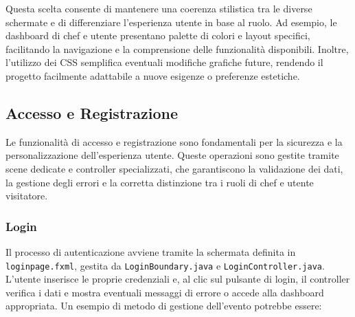 Questa scelta consente di mantenere una coerenza stilistica tra le diverse schermate e di differenziare l’esperienza utente in base al ruolo. Ad esempio, le dashboard di chef e utente presentano palette di colori e layout specifici, facilitando la navigazione e la comprensione delle funzionalità disponibili. Inoltre, l’utilizzo dei CSS semplifica eventuali modifiche grafiche future, rendendo il progetto facilmente adattabile a nuove esigenze o preferenze estetiche.

\subsection{Accesso e Registrazione}
Le funzionalità di accesso e registrazione sono fondamentali per la sicurezza e la personalizzazione dell’esperienza utente. Queste operazioni sono gestite tramite scene dedicate e controller specializzati, che garantiscono la validazione dei dati, la gestione degli errori e la corretta distinzione tra i ruoli di chef e utente visitatore.

\subsubsection{Login}
Il processo di autenticazione avviene tramite la schermata definita in \texttt{loginpage.fxml}, gestita da \texttt{LoginBoundary.java} e \texttt{LoginController.java}. L'utente inserisce le proprie credenziali e, al clic sul pulsante di login, il controller verifica i dati e mostra eventuali messaggi di errore o accede alla dashboard appropriata. Un esempio di metodo di gestione dell'evento potrebbe essere:

